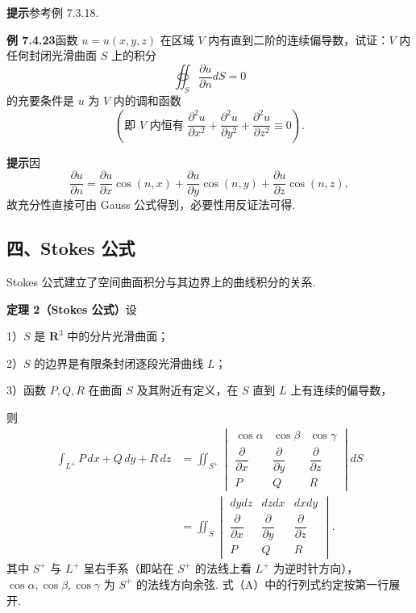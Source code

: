 \documentclass[UTF8,12pt,a4paper,fontset=fandol]{ctexart}
\begin{document}
\noindent\textbf{提示}\quad 参考例 7.3.18.

\noindent\textbf{例 7.4.23}\quad 函数 $u=u(x,y,z)$ 在区域 $V$ 内有直到二阶的连续偏导数，试证：$V$ 内任何封闭光滑曲面 $S$ 上的积分
\[
\oiint_S\frac{\partial u}{\partial n}dS=0
\]
的充要条件是 $u$ 为 $V$ 内的调和函数
\[
\left(\text{即 $V$ 内恒有 }\frac{\partial^2u}{\partial x^2}+\frac{\partial^2u}{\partial y^2}+\frac{\partial^2u}{\partial z^2}\equiv0\right).
\]

\noindent\textbf{提示}\quad 因
\[
\frac{\partial u}{\partial n}
=\frac{\partial u}{\partial x}\cos(n,x)
+\frac{\partial u}{\partial y}\cos(n,y)
+\frac{\partial u}{\partial z}\cos(n,z),
\]
故充分性直接可由 Gauss 公式得到，必要性用反证法可得.

\subsection*{四、Stokes 公式}

Stokes 公式建立了空间曲面积分与其边界上的曲线积分的关系.

\noindent\textbf{定理 2（Stokes 公式）}\quad 设

1）$S$ 是 $\mathbf R^3$ 中的分片光滑曲面；

2）$S$ 的边界是有限条封闭逐段光滑曲线 $L$；

3）函数 $P,Q,R$ 在曲面 $S$ 及其附近有定义，在 $S$ 直到 $L$ 上有连续的偏导数，

则
\begin{equation}
\begin{aligned}
\int_{L^+}P\,dx+Q\,dy+R\,dz
&=\iint_{S^+}
\begin{vmatrix}
\cos\alpha & \cos\beta & \cos\gamma\\
\dfrac{\partial}{\partial x} & \dfrac{\partial}{\partial y} & \dfrac{\partial}{\partial z}\\
P & Q & R
\end{vmatrix}dS\\
&=\iint_S
\begin{vmatrix}
dydz & dzdx & dxdy\\
\dfrac{\partial}{\partial x} & \dfrac{\partial}{\partial y} & \dfrac{\partial}{\partial z}\\
P & Q & R
\end{vmatrix}.
\end{aligned}
\tag{A}
\end{equation}
其中 $S^+$ 与 $L^+$ 呈右手系（即站在 $S^+$ 的法线上看 $L^+$ 为逆时针方向），$\cos\alpha,\cos\beta,\cos\gamma$ 为 $S^+$ 的法线方向余弦. 式（A）中的行列式约定按第一行展开.
\end{document}

